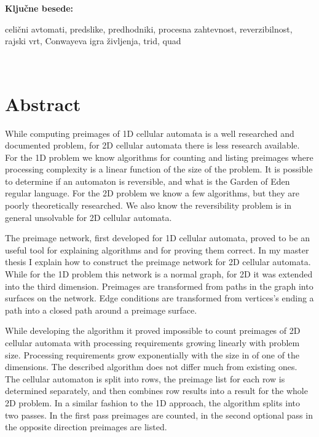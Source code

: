 \documentclass[12pt,a4paper,openany,twoside]{book}
\begin{document}
\vspace{1.3cm}
\noindent
{\large \bf Ključne besede:}

\vspace{0.5cm}
\noindent
celični avtomati, predslike, predhodniki, procesna zahtevnost, reverzibilnost, rajski vrt, Conwayeva igra življenja, trid, quad
\newpage

\ \thispagestyle{empty}
\newpage

\chapter*{Abstract}


While computing preimages of 1D cellular automata is a well researched and documented problem,
for 2D cellular automata there is less research available.
For the 1D problem we know algorithms for counting and listing preimages
where processing complexity is a linear function of the size of the problem.
It is possible to determine if an automaton is reversible,
and what is the Garden of Eden regular language.
For the 2D problem we know a few algorithms,
but they are poorly theoretically researched.
We also know the reversibility problem is
in general unsolvable for 2D cellular automata.

The preimage network, first developed for 1D cellular automata,
proved to be an useful tool for explaining algorithms and for proving them correct.
In my master thesis I explain how to construct the preimage network for 2D cellular automata.
While for the 1D problem this network is a normal graph,
for 2D it was extended into the third dimension.
Preimages are transformed from paths in the graph into surfaces on the network.
Edge conditions are transformed from vertices's ending a path
into a closed path around a preimage surface.

While developing the algorithm it proved impossible
to count preimages of 2D cellular automata
with processing requirements growing linearly with problem size.
Processing requirements grow exponentially
with the size in of one of the dimensions.
The described algorithm does not differ much from existing ones.
The cellular automaton is split into rows,
the preimage list for each row is determined separately,
and then combines row results into a result for the whole 2D problem.
In a similar fashion to the 1D approach,
the algorithm splits into two passes.
In the first pass preimages are counted,
in the second optional pass in the opposite direction preimages are listed.
\end{document}
